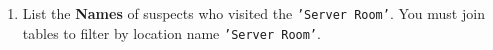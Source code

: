 \documentclass[12pt,a4paper]{article}
\begin{document}
\begin{enumerate}



    \item List the \textbf{Names} of suspects who visited the \texttt{'Server Room'}. You must join tables to filter by location name \texttt{'Server Room'}.




\end{enumerate}
\end{document}
